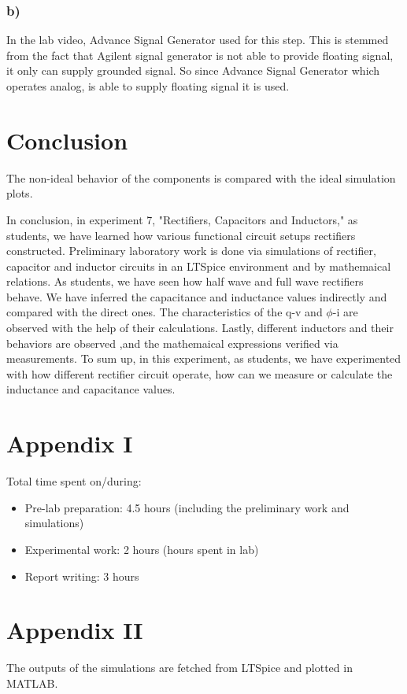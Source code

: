\documentclass[letterpaper,12pt]{article}
\begin{document}
\subsubsection{b)}
In the lab video, Advance Signal Generator used for this step. This is stemmed from the fact that Agilent signal generator is not able to provide floating signal, it only can supply grounded signal. So since Advance Signal Generator which operates analog, is able to supply floating signal it is used. 
\section{Conclusion}
The non-ideal behavior of the components is compared with the ideal simulation plots.

In conclusion, in experiment 7, "Rectifiers, Capacitors and Inductors," as students, we have learned how various functional circuit setups rectifiers constructed. Preliminary laboratory work is done via simulations of rectifier, capacitor and inductor circuits in an LTSpice environment and by mathemaical relations. As students, we have seen how half wave and full wave rectifiers behave. We have inferred the capacitance and inductance values indirectly and compared with the direct ones. The characteristics of the q-v and \(\phi\)-i are observed with the help of their calculations. Lastly, different inductors and their behaviors are observed ,and the mathemaical expressions verified via measurements. To sum up, in this experiment, as students, we have experimented with how different rectifier circuit operate, how can we measure or calculate the inductance and capacitance values. 
\section*{Appendix I}
Total time spent on/during:
\begin{itemize}
	\item Pre-lab preparation: 4.5 hours (including the preliminary work and simulations) 
	\item Experimental work: 2 hours (hours spent in lab)
	\item Report writing: 3 hours 
\end{itemize}
\section*{Appendix II}
The outputs of the simulations are fetched from LTSpice and plotted in MATLAB. 



\end{document}
